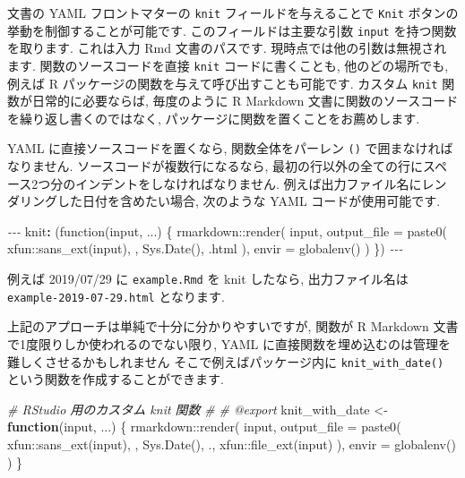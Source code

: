 \documentclass[
  11pt,
]{bxjsreport}
\newenvironment{Shaded}{\begin{snugshade}}{\end{snugshade}}
\newcommand{\AttributeTok}[1]{\textcolor[rgb]{0.77,0.63,0.00}{#1}}
\newcommand{\CommentTok}[1]{\textcolor[rgb]{0.56,0.35,0.01}{\textit{#1}}}
\newcommand{\ControlFlowTok}[1]{\textcolor[rgb]{0.13,0.29,0.53}{\textbf{#1}}}
\newcommand{\FunctionTok}[1]{\textcolor[rgb]{0.00,0.00,0.00}{#1}}
\newcommand{\KeywordTok}[1]{\textcolor[rgb]{0.13,0.29,0.53}{\textbf{#1}}}
\newcommand{\NormalTok}[1]{#1}
\newcommand{\OtherTok}[1]{\textcolor[rgb]{0.56,0.35,0.01}{#1}}
\newcommand{\PreprocessorTok}[1]{\textcolor[rgb]{0.56,0.35,0.01}{\textit{#1}}}
\newcommand{\SpecialCharTok}[1]{\textcolor[rgb]{0.00,0.00,0.00}{#1}}
\newcommand{\StringTok}[1]{\textcolor[rgb]{0.31,0.60,0.02}{#1}}
\begin{document}
文書の YAML フロントマターの \texttt{knit} フィールドを与えることで \texttt{Knit} ボタンの挙動を制御することが可能です. このフィールドは主要な引数 \texttt{input} を持つ関数を取ります. これは入力 Rmd 文書のパスです. 現時点では他の引数は無視されます. 関数のソースコードを直接 \texttt{knit} コードに書くことも, 他のどの場所でも, 例えば R パッケージの関数を与えて呼び出すことも可能です. カスタム \texttt{knit} 関数が日常的に必要ならば, 毎度のように R Markdown 文書に関数のソースコードを繰り返し書くのではなく, パッケージに関数を置くことをお薦めします.

YAML に直接ソースコードを置くなら, 関数全体をパーレン \texttt{()} で囲まなければなりません. ソースコードが複数行になるなら, 最初の行以外の全ての行にスペース2つ分のインデントをしなければなりません. 例えば出力ファイル名にレンダリングした日付を含めたい場合, 次のような YAML コードが使用可能です.

\begin{Shaded}
\begin{Highlighting}[]
\PreprocessorTok{{-}{-}{-}}
\FunctionTok{knit}\KeywordTok{:}\AttributeTok{ (function(input, ...) \{}
\AttributeTok{    rmarkdown::render(}
\AttributeTok{      input,}
\AttributeTok{      output\_file = paste0(}
\AttributeTok{        xfun::sans\_ext(input), \textquotesingle{}{-}\textquotesingle{}, Sys.Date(), \textquotesingle{}.html\textquotesingle{}}
\AttributeTok{      ),}
\AttributeTok{      envir = globalenv()}
\AttributeTok{    )}
\AttributeTok{  \})}
\PreprocessorTok{{-}{-}{-}}
\end{Highlighting}
\end{Shaded}

例えば 2019/07/29 に \texttt{example.Rmd} を knit したなら, 出力ファイル名は \texttt{example-2019-07-29.html} となります.

上記のアプローチは単純で十分に分かりやすいですが, 関数が R Markdown 文書で1度限りしか使われるのでない限り, YAML に直接関数を埋め込むのは管理を難しくさせるかもしれません そこで例えばパッケージ内に \texttt{knit\_with\_date()} という関数を作成することができます.

\begin{Shaded}
\begin{Highlighting}[numbers=left,,]
\CommentTok{\#\textquotesingle{} RStudio 用のカスタム knit 関数}
\CommentTok{\#\textquotesingle{}}
\CommentTok{\#\textquotesingle{} @export}
\NormalTok{knit\_with\_date }\OtherTok{\textless{}{-}} \ControlFlowTok{function}\NormalTok{(input, ...) \{}
\NormalTok{  rmarkdown}\SpecialCharTok{::}\FunctionTok{render}\NormalTok{(}
\NormalTok{    input,}
    \AttributeTok{output\_file =} \FunctionTok{paste0}\NormalTok{(}
\NormalTok{        xfun}\SpecialCharTok{::}\FunctionTok{sans\_ext}\NormalTok{(input), }\StringTok{\textquotesingle{}{-}\textquotesingle{}}\NormalTok{, }\FunctionTok{Sys.Date}\NormalTok{(), }\StringTok{\textquotesingle{}.\textquotesingle{}}\NormalTok{,}
\NormalTok{        xfun}\SpecialCharTok{::}\FunctionTok{file\_ext}\NormalTok{(input)}
\NormalTok{    ),}
    \AttributeTok{envir =} \FunctionTok{globalenv}\NormalTok{()}
\NormalTok{  )}
\NormalTok{\}}
\end{Highlighting}
\end{Shaded}
\end{document}
